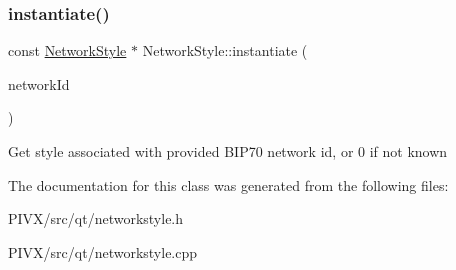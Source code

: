 \subsubsection{\texorpdfstring{instantiate()}{instantiate()}}
{\footnotesize\ttfamily const \mbox{\hyperlink{class_network_style}{Network\+Style}} $\ast$ Network\+Style\+::instantiate (\begin{DoxyParamCaption}\item[{const Q\+String \&}]{network\+Id }\end{DoxyParamCaption})\hspace{0.3cm}{\ttfamily [static]}}

Get style associated with provided B\+I\+P70 network id, or 0 if not known 

The documentation for this class was generated from the following files\+:\begin{DoxyCompactItemize}
\item 
P\+I\+V\+X/src/qt/networkstyle.\+h\item 
P\+I\+V\+X/src/qt/networkstyle.\+cpp\end{DoxyCompactItemize}
